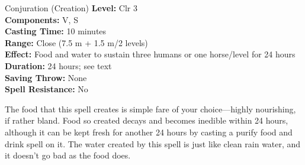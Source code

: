 {Conjuration (Creation)}
{
	\textbf{Level:}
	Clr 3\\
	\textbf{Components:}
	V, S\\
	\textbf{Casting Time:}
	10 minutes\\
	\textbf{Range:}
	Close (7.5 m + 1.5 m/2 levels)\\
	\textbf{Effect:}
	Food and water to sustain three humans or one horse/level for 24 hours\\
	\textbf{Duration:}
	24 hours; see text\\
	\textbf{Saving Throw:}
	None\\
	\textbf{Spell Resistance:}
	No\\
}
{
	The food that this spell creates is simple fare of your choice---highly nourishing, if rather bland. Food so created decays and becomes inedible within 24 hours, although it can be kept fresh for another 24 hours by casting a purify food and drink spell on it. The water created by this spell is just like clean rain water, and it doesn't go bad as the food does.

}
